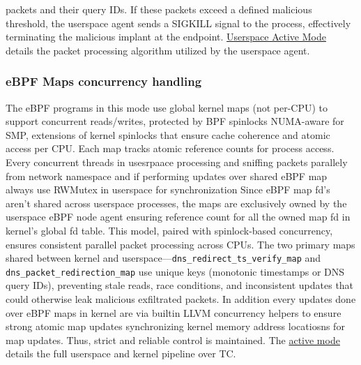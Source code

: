 \documentclass [11pt, proquest] {uwthesis}[2020/02/24]
\begin{document}
packets and their query IDs. If these packets exceed a defined malicious threshold, the userspace agent sends a SIGKILL signal to the process, effectively terminating the malicious implant at the endpoint.
\hyperref[sec:alg3]{Userspace Active Mode} details the packet processing algorithm utilized by the userspace agent.


\subsubsection{\textbf{eBPF Maps concurrency handling}}
\label{active:sec3}
The eBPF programs in this mode use global kernel maps (not per-CPU) to support concurrent reads/writes, protected by BPF spinlocks NUMA-aware for SMP, extensions of kernel spinlocks that ensure cache coherence and atomic access per CPU. Each map tracks atomic reference counts for process access. Every concurrent threads in usesrpaace processing and sniffing packets parallely from network namespace and if performing updates over shared eBPF map always use RWMutex in userspace for synchronization Since eBPF map fd's aren’t shared across userspace processes, the maps are exclusively owned by the userspace eBPF node agent ensuring reference count for all the owned map fd in kernel's global fd table. This model, paired with spinlock-based concurrency, ensures consistent parallel packet processing across CPUs. The two primary maps shared between kernel and userspace—\texttt{dns\_redirect\_ts\_verify\_map} and \texttt{dns\_packet\_redirection\_map} use unique keys (monotonic timestamps or DNS query IDs), preventing stale reads, race conditions, and inconsistent updates that could otherwise leak malicious exfiltrated packets. In addition every updates done over eBPF maps in kernel are via builtin LLVM concurrency helpers to ensure strong atomic map updates synchronizing kernel memory address locatiosns for map updates. Thus, strict and reliable control is maintained. The \hyperref[sec:dp-active-phase]{active mode} details the full userspace and kernel pipeline over TC. 
\end{document}
